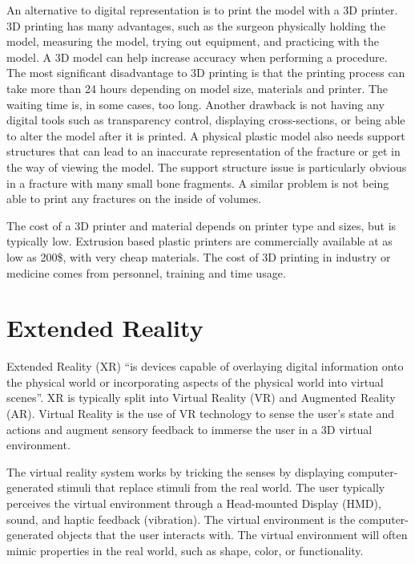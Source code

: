 \documentclass[a4paper]{report}
\begin{document}
An alternative to digital representation is to print the model with a 3D printer. 3D printing has many advantages, such as the surgeon physically holding the model, measuring the model, trying out equipment, and practicing with the model. A 3D model can help increase accuracy when performing a procedure\cite{shahrubudin_overview_2019}.
The most significant disadvantage to 3D printing is that the printing process can take more than 24 hours depending on model size, materials and printer. The waiting time is, in some cases, too long. 
Another drawback is not having any digital tools such as transparency control, displaying cross-sections, or being able to alter the model after it is printed. 
A physical plastic model also needs support structures that can lead to an inaccurate representation of the fracture or get in the way of viewing the model. The support structure issue is particularly obvious in a fracture with many small bone fragments. A similar problem is not being able to print any fractures on the inside of volumes.

The cost of a 3D printer and material depends on printer type and sizes, but is typically low. Extrusion based plastic printers are commercially available at as low as 200\$, with very cheap materials. The cost of 3D printing in industry or medicine comes from personnel, training and time usage\cite{shahrubudin_overview_2019}.


\section{Extended Reality}
Extended Reality (XR) \enquote{is devices capable of overlaying digital information onto the physical world or incorporating aspects of the physical world into virtual scenes}\cite{extended reality in medical}.
XR is typically split into Virtual Reality (VR) and Augmented Reality (AR).
Virtual Reality is the use of VR technology to sense the user's state and actions and augment sensory feedback to immerse the user in a 3D virtual environment\cite{mihelj_virtual_2014}.

The virtual reality system works by tricking the senses by displaying computer-generated stimuli that replace stimuli from the real world. The user typically perceives the virtual environment through a Head-mounted Display (HMD), sound, and haptic feedback (vibration). 
The virtual environment is the computer-generated objects that the user interacts with. The virtual environment will often mimic properties in the real world, such as shape, color, or functionality.
\end{document}
